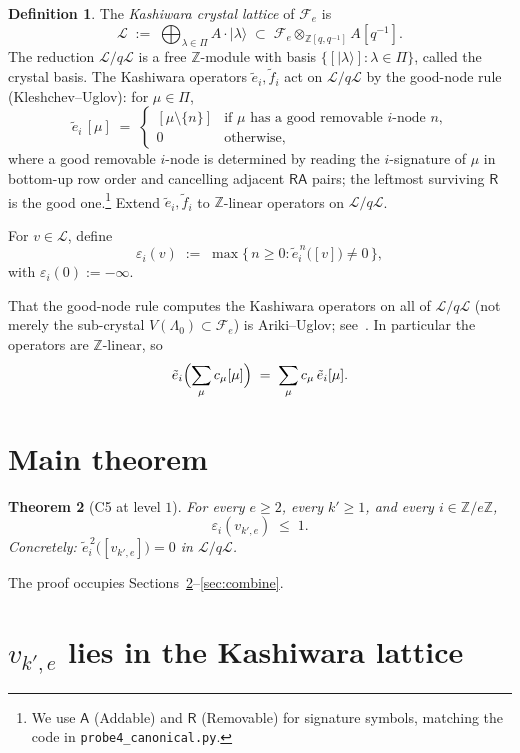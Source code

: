 \documentclass[11pt]{article}
\newtheorem{theorem}{Theorem}
\theoremstyle{definition}
\newtheorem{definition}[theorem]{Definition}
\newcommand{\Fock}{\mathcal{F}}
\newcommand{\Lam}{\Lambda_0}
\newcommand{\vke}{v_{k',e}}
\newcommand{\ZZ}{\mathbb{Z}}
\newcommand{\Lcr}{\mathcal{L}}
\newcommand{\ee}{\tilde e}
\newcommand{\ff}{\tilde f}
\newcommand{\eps}{\varepsilon}
\newcommand{\Aa}{{\mathsf A}}
\newcommand{\Rr}{{\mathsf R}}
\begin{document}
\begin{definition}
The \emph{Kashiwara crystal lattice} of $\Fock_e$ is
\[
  \Lcr \;:=\; \bigoplus_{\lambda \in \Pi} A \cdot |\lambda\rangle
  \;\subset\; \Fock_e \otimes_{\ZZ[q, q^{-1}]} A[q^{-1}].
\]
The reduction $\Lcr/q\Lcr$ is a free $\ZZ$-module with basis
$\{[|\lambda\rangle] : \lambda \in \Pi\}$, called the crystal basis.
The Kashiwara operators $\ee_i, \ff_i$ act on $\Lcr/q\Lcr$ by the
good-node rule (Kleshchev--Uglov): for $\mu \in \Pi$,
\[
  \ee_i \,[\mu] \;=\; \begin{cases}
    [\mu \setminus \{n\}] & \text{if $\mu$ has a good removable $i$-node $n$,} \\
    0 & \text{otherwise,}
  \end{cases}
\]
where a good removable $i$-node is determined by reading the $i$-signature
of $\mu$ in bottom-up row order and cancelling adjacent $\Rr\Aa$ pairs; the
leftmost surviving $\Rr$ is the good one.\footnote{
We use $\Aa$ (Addable) and $\Rr$ (Removable) for signature symbols,
matching the code in \texttt{probe4\_canonical.py}.}
Extend $\ee_i, \ff_i$ to $\ZZ$-linear operators on $\Lcr/q\Lcr$.
\end{definition}

For $v \in \Lcr$, define
\[
  \eps_i(v) \;:=\; \max\{\, n \ge 0 : \ee_i^{\,n}\bigl([v]\bigr) \ne 0 \,\},
\]
with $\eps_i(0) := -\infty$.

That the good-node rule computes the Kashiwara operators on all of
$\Lcr/q\Lcr$ (not merely the sub-crystal $V(\Lam) \subset \Fock_e$) is
Ariki--Uglov; see~\cite{LT1996, Uglov2000}. In particular the operators
are $\ZZ$-linear, so
\begin{equation}\label{eq:linearity}
  \ee_i\Bigl(\sum_\mu c_\mu [\mu]\Bigr) \;=\; \sum_\mu c_\mu \,\ee_i[\mu].
\end{equation}

\section{Main theorem}

\begin{theorem}[C5 at level $1$]\label{thm:C5}
For every $e \ge 2$, every $k' \ge 1$, and every $i \in \ZZ/e\ZZ$,
\[
  \eps_i(\vke) \;\le\; 1.
\]
Concretely: $\ee_i^{\,2}\bigl([\vke]\bigr) = 0$ in $\Lcr/q\Lcr$.
\end{theorem}

The proof occupies Sections~\ref{sec:in-L}--\ref{sec:combine}.

\section{$\vke$ lies in the Kashiwara lattice}\label{sec:in-L}
\end{document}
